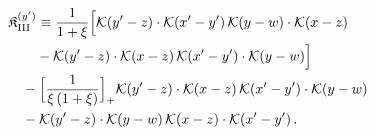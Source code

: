 \begin{align}\label{eq:K-y_rm_III}
&\mathfrak{K}^{(y')}_{\rm III}\equiv \frac{1}{1+\xi}\Big[\mathcal{K}(y'-z)\cdot\mathcal{K}(x'-y')\, \mathcal{K}(y-w)\cdot\mathcal{K}(x-z)\notag\\
&\quad\quad -\mathcal{K}(y'-z)\cdot\mathcal{K}(x-z)\, \mathcal{K}(x'-y')\cdot\mathcal{K}(y-w)\Big]\notag\\
&\quad -\Big[\frac{1}{\xi\,(1+\xi)}\Big]_{+}\mathcal{K}(y'-z)\cdot\mathcal{K}(x-z)\, \mathcal{K}(x'-y')\cdot\mathcal{K}(y-w)\notag\\
&\quad -\mathcal{K}(y'-z)\cdot\mathcal{K}(y-w)\, \mathcal{K}(x-z)\cdot\mathcal{K}(x'-y')\,.
\end{align}
